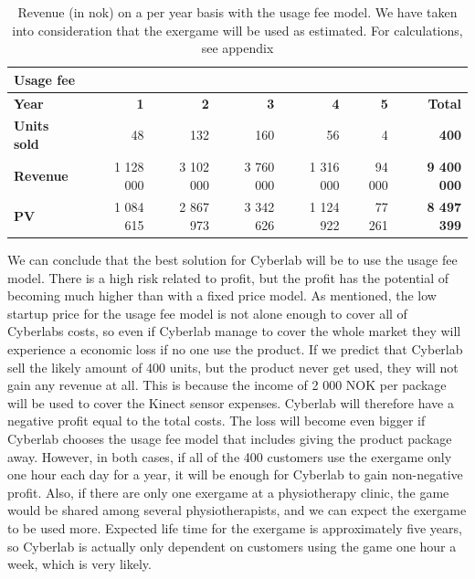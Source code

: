 \begin{table}
    \begin{tabular}{|l|r|r|r|r|r|r|}
        \hline
       \textbf{Usage fee}  & & & & & & \\ \hline
      \textbf{Year} & \textbf{1} & \textbf{2} & \textbf{3} & \textbf{4} & \textbf{5} & \textbf{Total}\\ \hline
	   \textbf{Units sold} & 48 & 132 & 160 & 56 & 4 & \textbf{400}\\ \hline
	   \textbf{Revenue} & 1 128 000 & 3 102 000 & 3 760 000 & 1 316 000 & 94 000 & \textbf{9 400 000} \\ \hline  
	   \textbf{PV} & 1 084 615 & 2 867 973 & 3 342 626 & 1 124 922 & 77 261 & \textbf{8 497 399}  \\ \hline
    \end{tabular}
    \caption[Revenue with use of Usage Fee Model]{Revenue (in \ac{nok}) on a per year basis with the usage fee model. We have taken into consideration that the exergame will be used as estimated. For calculations, see appendix}
    \label{tab:revusage}
\end{table}
We can conclude that the best solution for Cyberlab will be to use the usage fee model. There is a high risk related to profit, but the profit has the potential of becoming much higher than with a fixed price model. As mentioned, the low startup price for the usage fee model is not alone enough to cover all of Cyberlabs costs, so even if Cyberlab manage to cover the whole market they will experience a economic loss if no one use the product. If we predict that Cyberlab sell the likely amount of 400 units, but the product never get used, they will not gain any revenue at all. This is because the income of 2 000 NOK per package will be used to cover the Kinect sensor expenses. Cyberlab will therefore have a negative profit equal to the total costs. The loss will become even bigger if Cyberlab chooses the usage fee model that includes giving the product package away. However, in both cases, if all of the 400 customers use the exergame only one hour each day for a year, it will be enough for Cyberlab to gain non-negative profit. Also, if there are only one exergame at a physiotherapy clinic, the game would be shared among several physiotherapists, and we can expect the exergame to be used more. Expected life time for the exergame is approximately five years, so Cyberlab is actually only dependent on customers using the game one hour a week, which is very likely. \\ \\   
